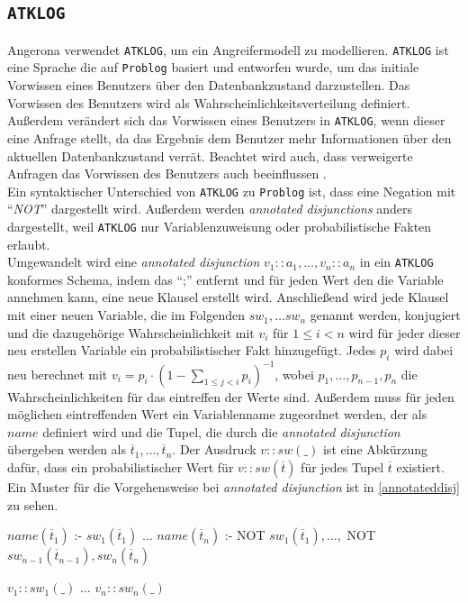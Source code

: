 \documentclass[german,version-2020-11]{uzl-thesis}
\begin{document}
\subsection{\texttt{ATKLOG}} \label{sub:atklog}
Angerona verwendet \texttt{ATKLOG}, um ein Angreifermodell zu modellieren. \texttt{ATKLOG} ist eine Sprache die auf \texttt{Problog} basiert und entworfen wurde, um das initiale Vorwissen eines Benutzers über den Datenbankzustand darzustellen. Das Vorwissen des Benutzers wird als Wahrscheinlichkeitsverteilung definiert. Außerdem verändert sich das Vorwissen eines Benutzers in \texttt{ATKLOG}, wenn dieser eine Anfrage stellt, da das Ergebnis dem Benutzer mehr Informationen über den aktuellen Datenbankzustand verrät. Beachtet wird auch, dass verweigerte Anfragen das Vorwissen des Benutzers auch beeinflussen \cite{guarnieri2017securing}. \\ 
Ein syntaktischer Unterschied von \texttt{ATKLOG} zu \texttt{Problog} ist, dass eine Negation mit \enquote{\textit{NOT}} dargestellt wird. Außerdem werden \textit{annotated disjunctions} anders dargestellt, weil \texttt{ATKLOG} nur Variablenzuweisung oder probabilistische Fakten erlaubt. \\ Umgewandelt wird eine \textit{annotated disjunction} $v_1::a_1, ..., v_n::a_n$ in ein \texttt{ATKLOG} konformes Schema, indem das \enquote{;} entfernt und für jeden Wert den die Variable annehmen kann, eine neue Klausel erstellt wird. Anschließend wird jede Klausel mit einer neuen Variable, die im Folgenden $sw_1, \dots sw_n$ genannt werden, konjugiert und die dazugehörige Wahrscheinlichkeit mit $v_i$ für $1 \leq i < n$ wird für jeder dieser neu erstellen Variable ein probabilistischer Fakt hinzugefügt. Jedes $p_i$ wird dabei neu berechnet mit $v_i = p_i \cdot (1 - \sum_{1\leq j<i}p_i)^{-1}$, wobei $p_1, \dots ,p_{n-1}, p_n$ die Wahrscheinlichkeiten für das eintreffen der Werte sind.
Außerdem muss für jeden möglichen eintreffenden Wert ein Variablenname zugeordnet werden, der als $name$ definiert wird und die Tupel, die durch die \textit{annotated disjunction} übergeben werden als $\overline{t}_1 , \dots , \overline{t}_n$. Der Ausdruck $v::sw(\_)$ ist eine Abkürzung dafür, dass ein probabilistischer Wert für $v::sw(\overline{t})$ für jedes Tupel $\overline{t}$ existiert. Ein Muster für die Vorgehensweise bei \textit{annotated disjunction} ist in \autoref{annotateddisj} zu sehen.
\begin{Pseudocode}[caption={Vorgehensweise bei \textit{annotated disjunction}}, label={annotateddisj}, numbers=left]
$name(\overline{t}_1)$ :- $sw_1(\overline{t}_1)$
$\dots$
$name(\overline{t}_n)$ :- NOT $sw_1(\overline{t}_1), \dots ,$ NOT $sw_{n−1}(\overline{t}_{n−1}), sw_n(\overline{t}_n)$
	
$v_1::sw_1(\_)$
$\dots$
$v_n::sw_n(\_)$
\end{Pseudocode} 
\end{document}

